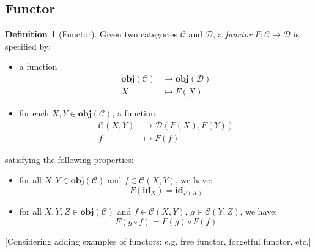 \documentclass[12pt,twoside,a4paper]{report}
\theoremstyle{definition}
\newtheorem*{definition*}{Definition}
\theoremstyle{definition}
\begin{document}
        
        \subsection{Functor}
        \begin{definition*}[Functor]
            Given two categories $\mathcal{C}$ and $\mathcal{D}$, a \emph{functor} $F: \mathcal{C} \to \mathcal{D}$ is specified by:
            \begin{itemize}
                \item 
                    a function 
                    \[\begin{aligned}
                        \textbf{obj}(\mathcal{C}) &\to \textbf{obj}(\mathcal{D}) \\
                        X &\mapsto F(X)
                    \end{aligned}\]

                \item 
                    for each $X, Y \in \textbf{obj}(\mathcal{C})$, a function 
                    \[\begin{aligned}
                        \mathcal{C}{(X,Y)} &\to \mathcal{D}{(F(X),F(Y))} \\
                        f &\mapsto F(f)
                    \end{aligned}\]
            \end{itemize}
            satisfying the following properties:
            \begin{itemize}
                \item 
                    for all $X, Y \in \textbf{obj}(\mathcal{C})$ and $f \in \mathcal{C}{(X,Y)}$, we have:
                    \begin{equation} \label{law: functor_id}
                        F(\textbf{id}_X) = \textbf{id}_{F(X)}
                    \end{equation}
                \item
                    for all $X, Y, Z \in \textbf{obj}(\mathcal{C})$ and $f \in \mathcal{C}{(X,Y)}$, $g \in \mathcal{C}{(Y,Z)}$, we have:
                    \begin{equation} \label{law: functor_comp}
                        F(g \circ f) = F(g) \circ F(f)
                    \end{equation}
            \end{itemize}
        \end{definition*}

        [Considering adding examples of functors: e.g. free functor, forgetful functor, etc.]
\end{document}
